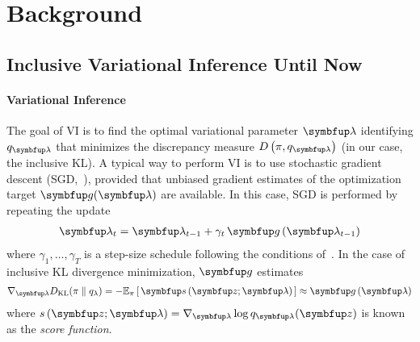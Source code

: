 
\section{Background}
\vspace{-0.05in}
\subsection{Inclusive Variational Inference Until Now}\label{section:ivi_previous}
\vspace{-0.05in}
\paragraph{Variational Inference}
The goal of VI is to find the optimal variational parameter \(\vlambda\) identifying \(q_{\vlambda}\) that minimizes the discrepancy measure \(D\left(\pi, q_{\vlambda}\right)\) (in our case, the inclusive KL).
A typical way to perform VI is to use stochastic gradient descent (SGD,~\citealt{robbins_stochastic_1951, bottou_online_1999}), provided that unbiased gradient estimates of the optimization target \(\vg(\vlambda)\) are available.
In this case, SGD is performed by repeating the update
\begin{align}
  \vlambda_{t} = \vlambda_{t-1} + \gamma_{t} \, \vg\left(\vlambda_{t-1}\right)
\end{align}
where \(\gamma_1, \ldots, \gamma_T\) is a step-size schedule following the conditions of~\citet{robbins_stochastic_1951, bottou_online_1999}.
In the case of inclusive KL divergence minimization, \(\vg\) estimates
%
{
\begin{align}
  \nabla_{\vlambda} \DKL{\pi}{q_{\lambda}}
  = -\Esub{\pi}{ \vs\,(\vz; \vlambda) } 
  \approx \vg\left(\vlambda\right)
\end{align}
}%
%
where \(s\,(\vz; \vlambda) = \nabla_{\vlambda} \log q_{\vlambda}(\vz)\) is known as the \textit{score function}.

\vspace{-0.05in}
